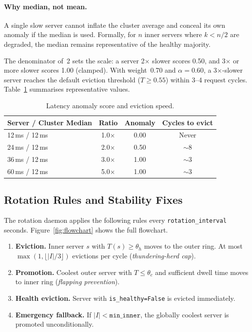 \documentclass[10pt,twocolumn]{article}
\begin{document}
\paragraph{Why median, not mean.}
A single slow server cannot inflate the cluster average and conceal its
own anomaly if the median is used.
Formally, for $n$ inner servers where $k < n/2$ are degraded, the median
remains representative of the healthy majority.

The denominator of~2 sets the scale:
a server 2$\times$ slower scores 0.50,
and 3$\times$ or more slower scores 1.00 (clamped).
With weight~0.70 and $\alpha=0.60$, a 3$\times$-slower server reaches
the default eviction threshold ($T \geq 0.55$) within 3--4 request cycles.
Table~\ref{tab:anomaly} summarises representative values.

\begin{table}[h]
\centering
\caption{Latency anomaly score and eviction speed.}
\label{tab:anomaly}
\small
\begin{tabular}{lccc}
\toprule
Server / Cluster Median & Ratio & Anomaly & Cycles to evict \\
\midrule
12\,ms / 12\,ms & 1.0$\times$ & 0.00 & Never \\
24\,ms / 12\,ms & 2.0$\times$ & 0.50 & ${\sim}8$ \\
36\,ms / 12\,ms & 3.0$\times$ & 1.00 & ${\sim}3$ \\
60\,ms / 12\,ms & 5.0$\times$ & 1.00 & ${\sim}3$ \\
\bottomrule
\end{tabular}
\end{table}

\subsection{Rotation Rules and Stability Fixes}

The rotation daemon applies the following rules every
\texttt{rotation\_interval} seconds.
Figure~\ref{fig:flowchart} shows the full flowchart.

\begin{enumerate}
\item \textbf{Eviction.} Inner server $s$ with $T(s) \geq \theta_h$
      moves to the outer ring.
      At most $\max(1, \lfloor|I|/3\rfloor)$ evictions per cycle
      (\emph{thundering-herd cap}).
\item \textbf{Promotion.} Coolest outer server with
      $T \leq \theta_c$ and sufficient dwell time moves to inner ring
      (\emph{flapping prevention}).
\item \textbf{Health eviction.} Server with \texttt{is\_healthy=False}
      is evicted immediately.
\item \textbf{Emergency fallback.} If $|I| < \texttt{min\_inner}$,
      the globally coolest server is promoted unconditionally.
\end{enumerate}
\end{document}
